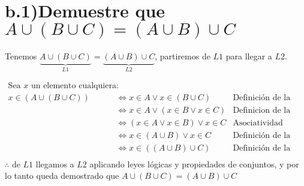 \documentclass{article}
\begin{document}
\newpage


\section*{b.1)Demuestre que $A \cup (B \cup C) = (A \cup B) \cup C$}

Tenemos $\underbrace{A \cup (B \cup C)}_{L1} =\underbrace{(A \cup B) \cup C}_{L2}$, partiremos de $L1$ para llegar a $L2$.

\begin{align*}
\text{Sea $x$ un elemento cualquiera:} \\
x \in (A \cup (B \cup C)) & \Leftrightarrow x \in A \lor x \in (B \cup C) & \text{Definición de la unión} \\
                          & \Leftrightarrow x \in A \lor (x \in B \lor x \in C) & \text{Definicion de la unión} \\
                          & \Leftrightarrow (x \in A \lor x \in B) \lor x \in C & \text{Asociatividad} \\
                          & \Leftrightarrow x \in (A \cup B) \lor x \in C & \text{Definición de la unión} \\
                          & \Leftrightarrow x \in ((A \cup B) \cup C) & \text{Definición de la unión} \\
\end{align*}
$\therefore$ de $L1$ llegamos a $L2$ aplicando leyes lógicas y propiedades de conjuntos, y
por lo tanto queda demostrado que $A \cup (B \cup C) = (A \cup B) \cup C$


\newpage
\end{document}

